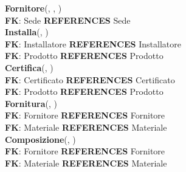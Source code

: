 \documentclass{article}
\begin{document}
\textbf{Fornitore}(\underline{}, , )\\
\indent\indent \textbf{FK}: Sede \textbf{REFERENCES} Sede\\

\textbf{Installa}(\underline{}, )\\
\indent\indent \textbf{FK}: Installatore \textbf{REFERENCES} Installatore\\
\indent\indent \textbf{FK}: Prodotto \textbf{REFERENCES} Prodotto\\

\textbf{Certifica}(\underline{}, )\\
\indent\indent \textbf{FK}: Certificato \textbf{REFERENCES} Certificato\\
\indent\indent \textbf{FK}: Prodotto \textbf{REFERENCES} Prodotto\\

\textbf{Fornitura}(\underline{}, )\\
\indent\indent \textbf{FK}: Fornitore \textbf{REFERENCES} Fornitore\\
\indent\indent \textbf{FK}: Materiale \textbf{REFERENCES} Materiale\\

\textbf{Composizione}(\underline{}, )\\
\indent\indent \textbf{FK}: Fornitore \textbf{REFERENCES} Fornitore\\
\indent\indent \textbf{FK}: Materiale \textbf{REFERENCES} Materiale\\





\newpage
{}



\end{document}
